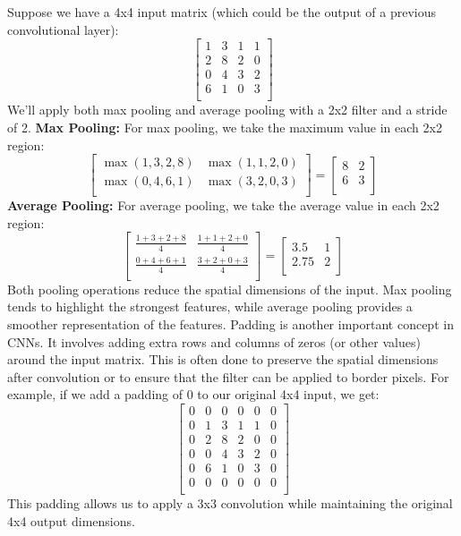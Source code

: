 Suppose we have a 4x4 input matrix (which could be the output of a previous convolutional layer):
\[
\begin{bmatrix}
1 & 3 & 1 & 1 \\
2 & 8 & 2 & 0 \\
0 & 4 & 3 & 2 \\
6 & 1 & 0 & 3 \\
\end{bmatrix}
\]
We'll apply both max pooling and average pooling with a 2x2 filter and a stride of 2.
\textbf{Max Pooling:}
For max pooling, we take the maximum value in each 2x2 region:
\[
\begin{bmatrix}
\max(1,3,2,8) & \max(1,1,2,0) \\
\max(0,4,6,1) & \max(3,2,0,3)\\
\end{bmatrix} =
\begin{bmatrix}
8 & 2 \\
6 & 3 \\
\end{bmatrix}
\]
\textbf{Average Pooling:}
For average pooling, we take the average value in each 2x2 region:
\[
\begin{bmatrix}
\frac{1+3+2+8}{4} & \frac{1+1+2+0}{4} \\
\frac{0+4+6+1}{4} & \frac{3+2+0+3}{4} \\
\end{bmatrix} =
\begin{bmatrix}
3.5 & 1 \\
2.75 & 2 \\
\end{bmatrix}
\]
Both pooling operations reduce the spatial dimensions of the input. Max pooling tends to highlight the strongest features, while average pooling provides a smoother representation of the features.
Padding is another important concept in CNNs. It involves adding extra rows and columns of zeros (or other values) around the input matrix. This is often done to preserve the spatial dimensions after convolution or to ensure that the filter can be applied to border pixels. For example, if we add a padding of 0 to our original 4x4 input, we get:
\[
\begin{bmatrix}
0 & 0 & 0 & 0 & 0 & 0 \\
0 & 1 & 3 & 1 & 1 & 0 \\
0 & 2 & 8 & 2 & 0 & 0 \\
0 & 0 & 4 & 3 & 2 & 0 \\
0 & 6 & 1 & 0 & 3 & 0 \\
0 & 0 & 0 & 0 & 0 & 0 \\
\end{bmatrix}
\]
This padding allows us to apply a 3x3 convolution while maintaining the original 4x4 output dimensions.

